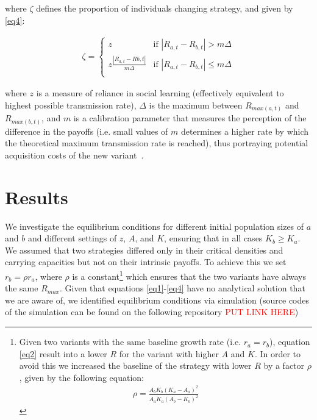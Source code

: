 \documentclass[review,authoryear]{elsarticle}
\begin{document}
where $\zeta$ defines the proportion of individuals changing strategy, and given by \eqref{eq4}:

\begin{equation}
\begin{aligned}
\label{eq4}
\zeta = 
\begin{cases}
z& \text{if }|R_{a,t}-R_{b,t}| > m\Delta\\
z\frac{|R_{a,t}-R{b,t}|}{m\Delta}& \text{if }|R_{a,t}-R_{b,t}| \leq m\Delta\\
\end{cases}
\end{aligned}
\end{equation}

where $z$ is a measure of reliance in social learning (effectively equivalent to highest possible transmission rate), $\Delta$ is the maximum between $R_{max(a,t)}$ and $R_{max(b,t)}$, and $m$ is a calibration parameter that measures the perception of the difference in the payoffs (i.e. small values of $m$ determines a higher rate by which the theoretical maximum transmission rate is reached), thus portraying potential acquisition costs of the new variant~\citep{henrich2001cultural}.

\section{Results}

We investigate the equilibrium conditions for different initial population sizes of $a$ and $b$ and different settings of $z$, $A$, and $K$, ensuring that in all cases $K_b \geq K_a$. We assumed that two strategies differed only in their critical densities and carrying capacities but not on their intrinsic payoffs. To achieve this we set $r_b=\rho r_a$, where $\rho$ is a constant\footnote{Given two variants with the same baseline growth rate (i.e. $r_a=r_b$), equation \eqref{eq2} result into a lower $R$ for the variant with higher $A$ and $K$. In order to avoid this we increased the baseline of the strategy with lower $R$ by a factor $\rho$, given by the following equation:
\begin{align*}
\rho=\frac{A_bK_b(K_a-A_a)^2}{A_aK_a(A_b-K_b)^2}
\end{align*}
  } 
which ensures that the two variants have always the same $R_{max}$. Given that equations \ref{eq1}-\ref{eq4} have no analytical solution that we are aware of, we identified equilibrium conditions via simulation (source codes of the simulation can be found on the following repository \textcolor{red}{PUT LINK HERE})
\end{document}
